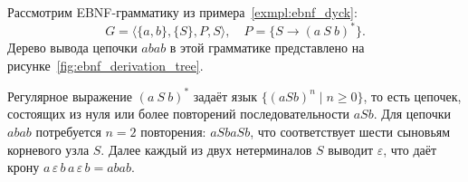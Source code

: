 \begin{example}
    Рассмотрим EBNF-грамматику из примера~\ref{exmpl:ebnf_dyck}:
    \[ G = \langle \{a, b\}, \{S\}, P, S \rangle, \quad P = \{S \to (a \ S \ b)^*\}. \]
    Дерево вывода цепочки $abab$ в этой грамматике представлено на рисунке~\ref{fig:ebnf_derivation_tree}.

    Регулярное выражение $(a \ S \ b)^*$ задаёт язык $\{(a S b)^n \mid n \geq 0\}$, то есть цепочек, состоящих из нуля или более повторений последовательности $a S b$.
    Для цепочки $abab$ потребуется $n = 2$ повторения: $a S b a S b$, что соответствует шести сыновьям корневого узла $S$.
    Далее каждый из двух нетерминалов $S$ выводит $\varepsilon$, что даёт крону $a\,\varepsilon\,b\,a\,\varepsilon\,b = abab$.

    \begin{marginfigure}
        \begin{center}
            \resizebox{\marginparwidth}{!}{}
        \end{center}
        \caption{Дерево вывода цепочки $abab$ в EBNF-грамматике $S \to (a \ S \ b)^*$}
        \label{fig:ebnf_derivation_tree}
    \end{marginfigure}
\end{example}
